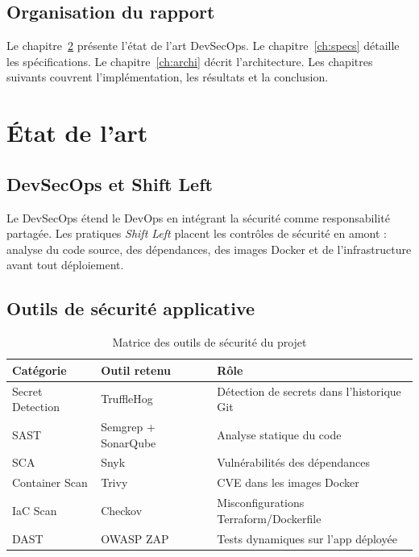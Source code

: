 \documentclass[12pt,a4paper]{report}
\begin{document}
\section{Organisation du rapport}
Le chapitre~\ref{ch:etat-art} présente l'état de l'art DevSecOps. Le chapitre~\ref{ch:specs} détaille les spécifications. Le chapitre~\ref{ch:archi} décrit l'architecture. Les chapitres suivants couvrent l'implémentation, les résultats et la conclusion.

\chapter{État de l'art}
\label{ch:etat-art}

\section{DevSecOps et Shift Left}
Le DevSecOps étend le DevOps en intégrant la sécurité comme responsabilité partagée. Les pratiques \textit{Shift Left} placent les contrôles de sécurité en amont : analyse du code source, des dépendances, des images Docker et de l'infrastructure avant tout déploiement.

\section{Outils de sécurité applicative}
\begin{table}[H]
\centering
\begin{tabular}{@{}lll@{}}
\toprule
\textbf{Catégorie} & \textbf{Outil retenu} & \textbf{Rôle} \\
\midrule
Secret Detection & TruffleHog & Détection de secrets dans l'historique Git \\
SAST & Semgrep + SonarQube & Analyse statique du code \\
SCA & Snyk & Vulnérabilités des dépendances \\
Container Scan & Trivy & CVE dans les images Docker \\
IaC Scan & Checkov & Misconfigurations Terraform/Dockerfile \\
DAST & OWASP ZAP & Tests dynamiques sur l'app déployée \\
\bottomrule
\end{tabular}
\caption{Matrice des outils de sécurité du projet}
\label{tab:outils}
\end{table}
\end{document}
